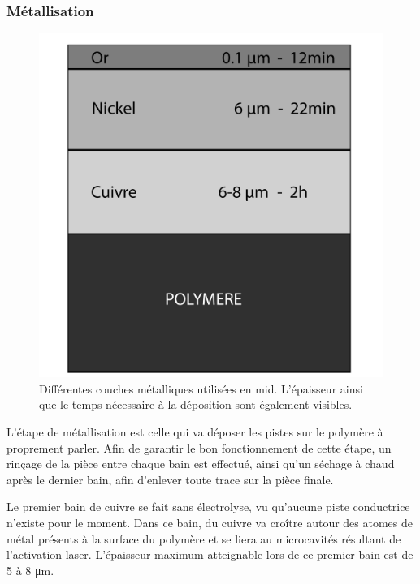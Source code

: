 \subsubsection{Métallisation}
\begin{figure}[h]
    \begin{center}
        \includegraphics[height=0.3\textheight]{images/CuNiAu}
        \caption{Différentes couches métalliques utilisées en \gls{mid}.
                 L'épaisseur ainsi que le temps nécessaire à la déposition sont également visibles.}
    \end{center}
\end{figure}
L'étape de métallisation est celle qui va déposer les pistes sur le polymère à proprement parler.
Afin de garantir le bon fonctionnement de cette étape, un rinçage de la pièce entre chaque bain est effectué, ainsi qu'un séchage à chaud après le dernier bain, afin d'enlever toute trace sur la pièce finale.

Le premier bain de cuivre se fait sans électrolyse, vu qu'aucune piste conductrice n'existe pour le moment.
Dans ce bain, du cuivre va croître autour des atomes de métal présents à la surface du polymère et se liera au microcavités résultant de l'activation laser.
L'épaisseur maximum atteignable lors de ce premier bain est de 5 à 8 \si{\micro\meter}.

